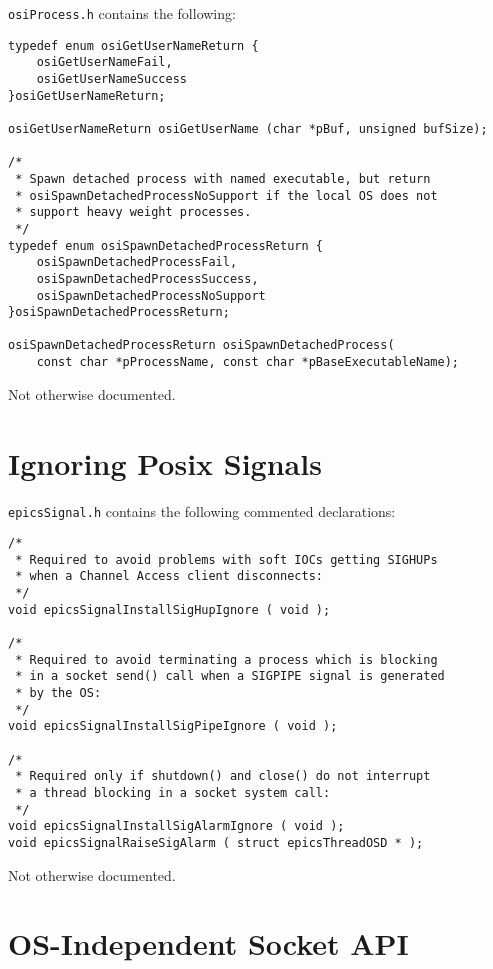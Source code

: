 \verb|osiProcess.h| contains the following:

\begin{verbatim}
typedef enum osiGetUserNameReturn {
    osiGetUserNameFail,
    osiGetUserNameSuccess
}osiGetUserNameReturn;

osiGetUserNameReturn osiGetUserName (char *pBuf, unsigned bufSize);

/*
 * Spawn detached process with named executable, but return
 * osiSpawnDetachedProcessNoSupport if the local OS does not
 * support heavy weight processes.
 */
typedef enum osiSpawnDetachedProcessReturn {
    osiSpawnDetachedProcessFail,
    osiSpawnDetachedProcessSuccess,
    osiSpawnDetachedProcessNoSupport
}osiSpawnDetachedProcessReturn;

osiSpawnDetachedProcessReturn osiSpawnDetachedProcess(
    const char *pProcessName, const char *pBaseExecutableName);

\end{verbatim}

Not otherwise documented.

\section{Ignoring Posix Signals}

\verb|epicsSignal.h| contains the following commented declarations:

\begin{verbatim}
/*
 * Required to avoid problems with soft IOCs getting SIGHUPs
 * when a Channel Access client disconnects:
 */
void epicsSignalInstallSigHupIgnore ( void );

/*
 * Required to avoid terminating a process which is blocking
 * in a socket send() call when a SIGPIPE signal is generated
 * by the OS:
 */
void epicsSignalInstallSigPipeIgnore ( void );

/*
 * Required only if shutdown() and close() do not interrupt
 * a thread blocking in a socket system call:
 */
void epicsSignalInstallSigAlarmIgnore ( void );
void epicsSignalRaiseSigAlarm ( struct epicsThreadOSD * );
\end{verbatim}

Not otherwise documented.

\section{OS-Independent Socket API}

